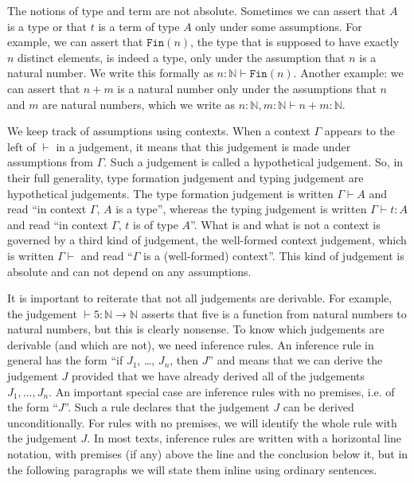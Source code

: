 \documentclass[declaration,mgr,english,shortabstract]{iithesis}
\newcommand{\m}[1]{\texttt{#1}}
\newcommand{\context}[1]{#1 \vdash}
\newcommand{\type}[2]{#1 \vdash #2}
\newcommand{\term}[3]{#1 \vdash #2 : #3}
\newcommand{\N}{\mathbb{N}}
\newcommand{\Fin}[1]{\m{Fin}(#1)}
\begin{document}
The notions of type and term are not absolute. Sometimes we can assert that $A$ is a type or that $t$ is a term of type $A$ only under some assumptions. For example, we can assert that $\Fin{n}$, the type that is supposed to have exactly $n$ distinct elements, is indeed a type, only under the assumption that $n$ is a natural number. We write this formally as $\type{n : \N}{\Fin{n}}$. Another example: we can assert that $n + m$ is a natural number only under the assumptions that $n$ and $m$ are natural numbers, which we write as $\term{n : \N, m : \N}{n + m}{\N}$.

We keep track of assumptions using contexts. When a context $\Gamma$ appears to the left of $\vdash$ in a judgement, it means that this judgement is made under assumptions from $\Gamma$. Such a judgement is called a hypothetical judgement. So, in their full generality, type formation judgement and typing judgement are hypothetical judgements. The type formation judgement is written $\type{\Gamma}{A}$ and read ``in context $\Gamma$, $A$ is a type'', whereas the typing judgement is written $\term{\Gamma}{t}{A}$ and read ``in context $\Gamma$, $t$ is of type $A$''. What is and what is not a context is governed by a third kind of judgement, the well-formed context judgement, which is written $\context{\Gamma}$ and read ``$\Gamma$ is a (well-formed) context''. This kind of judgement is absolute and can not depend on any assumptions.

It is important to reiterate that not all judgements are derivable. For example, the judgement $\term{}{5}{\N \to \N}$ asserts that five is a function from natural numbers to natural numbers, but this is clearly nonsense. To know which judgements are derivable (and which are not), we need inference rules. An inference rule in general has the form ``if $J_1$, \dots, $J_n$, then $J$'' and means that we can derive the judgement $J$ provided that we have already derived all of the judgements $J_1, \dots, J_n$. An important special case are inference rules with no premises, i.e. of the form ``$J$''. Such a rule declares that the judgement $J$ can be derived unconditionally. For rules with no premises, we will identify the whole rule with the judgement $J$. In most texts, inference rules are written with a horizontal line notation, with premises (if any) above the line and the conclusion below it, but in the following paragraphs we will state them inline using ordinary sentences.
\end{document}
